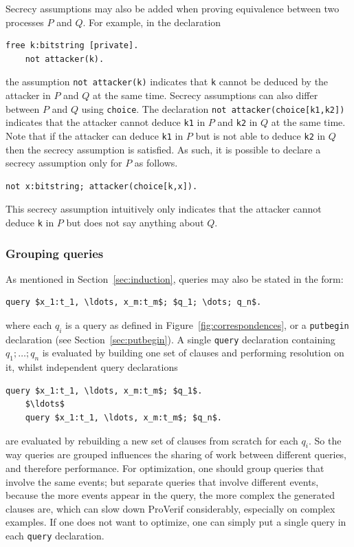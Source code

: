 \documentclass{book}
\begin{document}
Secrecy assumptions may also be added when proving equivalence between two processes $P$ and $Q$. For example, in the declaration
\begin{lstlisting}[numbers=none]
	free k:bitstring [private].
	not attacker(k).
\end{lstlisting}
the assumption \lstinline!not attacker(k)! indicates that \lstinline!k! cannot be deduced by the attacker in $P$ and $Q$ at the same time. Secrecy assumptions can also differ between $P$ and $Q$ using \lstinline!choice!. The declaration \lstinline!not attacker(choice[k1,k2])! indicates that the attacker cannot deduce \lstinline!k1! in $P$ and \lstinline!k2! in $Q$ at the same time. Note that if the attacker can deduce \lstinline!k1! in $P$ but is not able to deduce \lstinline!k2! in $Q$ then the secrecy assumption is satisfied. As such, it is possible to declare a secrecy assumption only for $P$ as follows.
\begin{lstlisting}[numbers=none]
	not x:bitstring; attacker(choice[k,x]).
\end{lstlisting}
This secrecy assumption intuitively only indicates that the attacker cannot deduce \lstinline!k! in $P$ but does not say anything about $Q$.

\subsubsection{Grouping queries}

As mentioned in Section~\ref{sec:induction}, queries may also be stated in the form:
%
\begin{lstlisting}[numbers=none]
	query $x_1:t_1, \ldots, x_m:t_m$; $q_1; \dots; q_n$.
\end{lstlisting}
%
where each $q_i$ is a query as defined in Figure~\ref{fig:correspondences},
or a \lstinline!putbegin! declaration (see Section~\ref{sec:putbegin}).
%
A single \lstinline{query} declaration containing $q_1; \dots; q_n$
is evaluated by building one set of clauses and performing resolution
on it, whilst independent  query declarations
\begin{lstlisting}[numbers=none]
	query $x_1:t_1, \ldots, x_m:t_m$; $q_1$.
	$\ldots$
	query $x_1:t_1, \ldots, x_m:t_m$; $q_n$.
\end{lstlisting}
are evaluated by
rebuilding a new set of clauses from scratch for each $q_i$.
So the way queries are
grouped influences the sharing of work between different queries,
and therefore performance.
For optimization,
one should group
queries that involve the same events; but separate queries that
involve different events, because the more events appear in the query,
the more complex the generated clauses are, which can slow down
ProVerif considerably, especially on complex examples. If one does not
want to optimize, one can simply put a single query in each
\lstinline{query} declaration.
\end{document}
